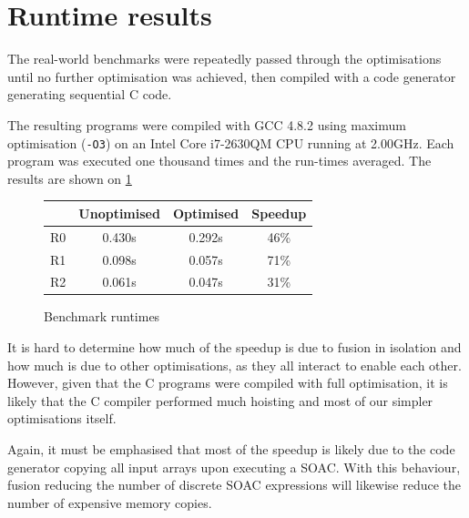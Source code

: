 \section{Runtime results}
\label{sec:runtime-results}

The real-world benchmarks were repeatedly passed through the \LO{}
optimisations until no further optimisation was achieved, then
compiled with a code generator generating sequential C code.

The resulting programs were compiled with GCC 4.8.2 using maximum
optimisation (\texttt{-O3}) on an Intel Core i7-2630QM CPU running at
2.00GHz.  Each program was executed one thousand times and the
run-times averaged.  The results are shown on \cref{fig:speedups}

\begin{figure}
\begin{center}
\begin{tabular}{l|c|c|c}
   & \textbf{Unoptimised} & \textbf{Optimised} & \textbf{Speedup} \\\hline
R0 & 0.430s & 0.292s & 46\% \\
R1 & 0.098s & 0.057s & 71\% \\
R2 & 0.061s & 0.047s & 31\%
\end{tabular}
\end{center}

\caption{Benchmark runtimes}
\label{fig:speedups}
\end{figure}

It is hard to determine how much of the speedup is due to fusion in
isolation and how much is due to other optimisations, as they all
interact to enable each other.  However, given that the C programs
were compiled with full optimisation, it is likely that the C compiler
performed much hoisting and most of our simpler optimisations itself.

Again, it must be emphasised that most of the speedup is likely due to
the code generator copying all input arrays upon executing a SOAC.
With this behaviour, fusion reducing the number of discrete SOAC
expressions will likewise reduce the number of expensive memory
copies.

